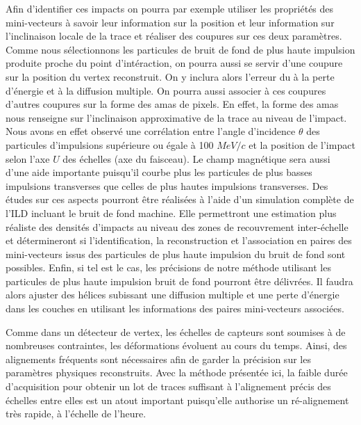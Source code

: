   Afin d'identifier ces impacts on pourra par exemple utiliser les propri\'et\'es des mini-vecteurs \`a savoir leur information sur la position et leur information sur l'inclinaison locale de la trace et r\'ealiser des coupures sur ces deux param\`etres. Comme nous s\'electionnons les particules de bruit de fond de plus haute impulsion produite proche du point d'intéraction, on pourra aussi se servir d'une coupure sur la position du vertex reconstruit. On y inclura alors l'erreur du \`a la perte d'\'energie et \`a la diffusion multiple. On pourra aussi associer \`a ces coupures d'autres coupures sur la forme des amas de pixels. En effet, la forme des amas nous renseigne sur l'inclinaison approximative de la trace au niveau de l'impact. Nous avons en effet observ\'e une corr\'elation entre l'angle d'incidence $\theta$ des particules d'impulsions sup\'erieure ou \'egale \`a 100 $MeV/c$ et la position de l'impact selon l'axe $U$ des \'echelles (axe du faisceau). Le champ magn\'etique sera aussi d'une aide importante puisqu'il courbe plus les particules de plus basses impulsions transverses que celles de plus hautes impulsions transverses. Des \'etudes sur ces aspects pourront \^etre r\'ealis\'ees \`a l'aide d'un simulation compl\`ete de l'ILD incluant le bruit de fond machine. Elle permettront une estimation plus r\'ealiste des densit\'es d'impacts au niveau des zones de recouvrement inter-\'echelle et détermineront si l'identification, la reconstruction et l'association en paires des mini-vecteurs issus des particules de plus haute impulsion du bruit de fond sont possibles. Enfin, si tel est le cas, les précisions de notre m\'ethode utilisant les particules de plus haute impulsion bruit de fond pourront \^etre d\'elivr\'ees. Il faudra alors ajuster des h\'elices subissant une diffusion multiple et une perte d'\'energie dans les couches en utilisant les informations des paires mini-vecteurs associ\'ees.

\medskip

Comme dans un d\'etecteur de vertex, les \'echelles de capteurs sont soumises \`a de nombreuses contraintes, les d\'eformations \'evoluent au cours du temps. Ainsi, des alignements fr\'equents sont n\'ecessaires afin de garder la pr\'ecision sur les param\`etres physiques reconstruits. Avec la m\'ethode pr\'esent\'ee ici, la faible dur\'ee d'acquisition pour obtenir un lot de traces suffisant \`a l'alignement pr\'ecis des \'echelles entre elles est un atout important puisqu'elle authorise un r\'e-alignement tr\`es rapide, \`a l'\'echelle de l'heure.

